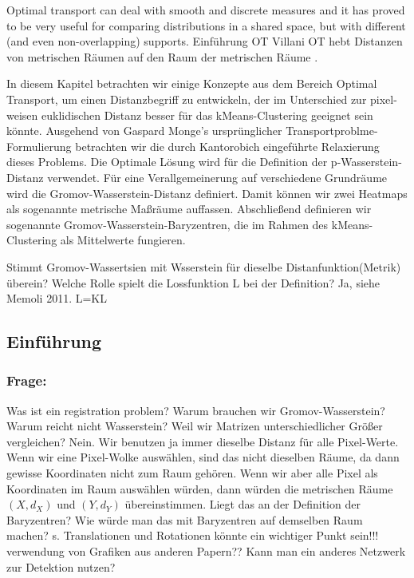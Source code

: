 \documentclass[11pt,a4paper]{article}
\numberwithin{equation}{section}
\begin{document}
	Optimal transport can deal with smooth and discrete measures and it has proved to be very useful
	for comparing distributions in a shared space, but with different (and even non-overlapping) supports\cite{vayer2020fused}.
	Einführung OT Villani%
	OT hebt Distanzen von metrischen Räumen auf den Raum der metrischen Räume \cite{memoli2011gromov}.
	
	In diesem Kapitel betrachten wir einige Konzepte aus dem Bereich Optimal Transport, um einen Distanzbegriff zu entwickeln, der im Unterschied zur pixel-weisen euklidischen Distanz besser für das kMeans-Clustering geeignet sein könnte.
	Ausgehend von Gaspard Monge's ursprünglicher Transportproblme-Formulierung betrachten wir die durch Kantorobich eingeführte Relaxierung dieses Problems.
	Die Optimale Lösung wird für die Definition der p-Wasserstein-Distanz verwendet.
	Für eine Verallgemeinerung auf verschiedene Grundräume wird die Gromov-Wasserstein-Distanz definiert. Damit können wir zwei Heatmaps als sogenannte metrische Maßräume auffassen.
	Abschließend definieren wir sogenannte Gromov-Wasserstein-Baryzentren, die im Rahmen des kMeans-Clustering als Mittelwerte fungieren.
	
	Stimmt Gromov-Wassertsien mit Wsserstein für dieselbe Distanfunktion(Metrik) überein? Welche Rolle spielt die Lossfunktion L bei der Definition? Ja, siehe Memoli 2011.
	L=KL
	\subsection{Einführung}
	\subsubsection{Frage:}
	Was ist ein registration problem?
	Warum brauchen wir Gromov-Wasserstein? Warum reicht nicht Wasserstein? Weil wir Matrizen unterschiedlicher Größer vergleichen? Nein. Wir benutzen ja immer dieselbe Distanz für alle Pixel-Werte.
	Wenn wir eine Pixel-Wolke auswählen, sind das nicht dieselben Räume, da dann gewisse Koordinaten nicht zum Raum gehören. Wenn wir aber alle Pixel als Koordinaten im Raum auswählen würden, dann würden die metrischen Räume $(X,d_X)$ und $(Y,d_Y)$ übereinstimmen. Liegt das an der Definition der Baryzentren? Wie würde man das mit Baryzentren auf demselben Raum machen? s. \cite{COTcuturi}
	Translationen und Rotationen könnte ein wichtiger Punkt sein!!!
	verwendung von Grafiken aus anderen Papern??
	Kann man ein anderes Netzwerk zur Detektion nutzen?
	
\end{document}
